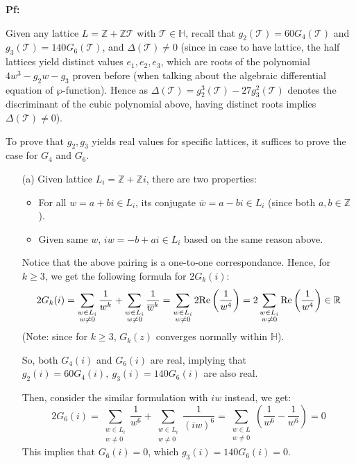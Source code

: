 \documentclass{article}
\begin{document}
\textbf{Pf:}

Given any lattice $L=\mathbb{Z}+\mathbb{Z}\mathcal{T}$ with $\mathcal{T}\in\mathbb{H}$, recall that $g_2(\mathcal{T}) = 60G_4(\mathcal{T})$ and $g_3(\mathcal{T})=140G_6(\mathcal{T})$, and $\Delta(\mathcal{T}) \neq 0$ (since in case to have lattice, the half lattices yield distinct values $e_1,e_2,e_3$, which are roots of the polynomial $4w^3-g_2w-g_3$ proven before (when talking about the algebraic differential equation of $\wp$-function). Hence as $\Delta(\mathcal{T})=g_2^3(\mathcal{T})-27g_3^2(\mathcal{T})$ denotes the discriminant of the cubic polynomial above, having distinct roots implies $\Delta(\mathcal{T})\neq 0$).

To prove that $g_2,g_3$ yields real values for specific lattices, it suffices to prove the case for $G_4$ and $G_6$.
\begin{itemize}
    \item[(a)] Given lattice $L_i = \mathbb{Z}+\mathbb{Z}i$, there are two properties:
    \begin{itemize}
        \item For all $w=a+bi\in L_i$, its conjugate $\overline{w}=a-bi\in L_i$ (since both $a,b\in\mathbb{Z}$).
        \item Given same $w$, $iw = -b+ai \in L_i$ based on the same reason above.
    \end{itemize}
    Notice that the above pairing is a one-to-one correspondance. Hence, for $k\geq 3$, we get the following formula for $2G_k(i)$:
    $$2G_k(i) = \sum_{\substack{w\in L_i\\w\neq 0}}\frac{1}{w^k}+\sum_{\substack{w\in L_i\\w\neq 0}}\frac{1}{\overline{w}^k} = \sum_{\substack{w\in L_i\\w\neq 0}}2\textmd{Re}\left(\frac{1}{w^4}\right) = 2\sum_{\substack{w\in L_i\\w\neq 0}}\textmd{Re}\left(\frac{1}{w^4}\right)\in \mathbb{R}$$
    (Note: since for $k\geq 3$, $G_k(z)$ converges normally within $\mathbb{H}$).

    So, both $G_4(i)$ and $G_6(i)$ are real, implying that $g_2(i)=60G_4(i),\ g_3(i)=140G_6(i)$ are also real.

    Then, consider the similar formulation with $iw$ instead, we get:
    $$2G_6(i) = \sum_{\substack{w\in L_i\\w\neq 0}}\frac{1}{w^6}+\sum_{\substack{w\in L_i\\w\neq 0}}\frac{1}{(iw)^6} = \sum_{\substack{w\in L\\w\neq 0}}\left(\frac{1}{w^6}-\frac{1}{w^6}\right) = 0$$
    This implies that $G_6(i) = 0$, which $g_3(i) = 140G_6(i)=0$.


\end{itemize}
\end{document}
